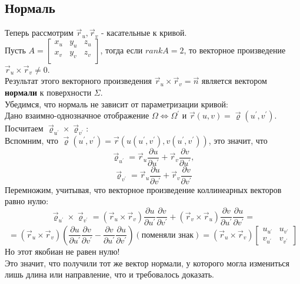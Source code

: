 \documentclass[12pt]{article}
\begin{document}
\subsection{Нормаль}
Теперь рассмотрим $\overrightarrow{r}_u, \overrightarrow{r}_v$ - касательные к кривой.\\
Пусть $A = \begin{bmatrix}
   x_u & y_u & z_u \\
   x_v & y_v & z_v \\
\end{bmatrix}$, тогда если $rank A = 2$, то векторное произведение $\overrightarrow{r}_u \times \overrightarrow{r}_v \neq 0$.\\
Результат этого векторного произведения $\overrightarrow{r}_u \times \overrightarrow{r}_v = \overrightarrow{n}$ является вектором \textbf{нормали} к поверхности $\Sigma$.\\
Убедимся, что нормаль не зависит от параметризации кривой:\\
Дано взаимно-однозначное отображение $\Omega \iff \Omega^{'}$ и $\overrightarrow{r}(u,v) = \overrightarrow{\varrho}(u^{'},v^{'})$.\\
Посчитаем $\overrightarrow{\varrho}_{u^{'}} \times \overrightarrow{\varrho}_{v^{'}}$:\\
Вспомним, что $\overrightarrow{\varrho}(u^{'},v^{'}) = \overrightarrow{r}(u(u^{'},v^{'}),v(u^{'},v^{'}))$, это значит, что\\
$$\overrightarrow{\varrho}_{u^{'}} = \overrightarrow{r}_u \frac{\partial u}{\partial u^{'}} + \overrightarrow{r}_v \frac{\partial v}{\partial u^{'}},$$
$$\overrightarrow{\varrho}_{v^{'}} = \overrightarrow{r}_u \frac{\partial u}{\partial v^{'}} + \overrightarrow{r}_v \frac{\partial v}{\partial v^{'}}$$
Перемножим, учитывая, что векторное произведение коллинеарных векторов равно нулю:\\
$$\overrightarrow{\varrho}_{u^{'}} \times \overrightarrow{\varrho}_{v^{'}} = (\overrightarrow{r}_u \times \overrightarrow{r}_v) \frac{\partial u}{\partial u^{'}} \frac{\partial v}{\partial v^{'}} + (\overrightarrow{r}_v \times \overrightarrow{r}_u) \frac{\partial v}{\partial u^{'}} \frac{\partial u}{\partial v^{'}} = $$
$$ = (\overrightarrow{r}_u \times \overrightarrow{r}_v) (\frac{\partial u}{\partial u^{'}} \frac{\partial v}{\partial v^{'}}-\frac{\partial v}{\partial u^{'}} \frac{\partial u}{\partial v^{'}}) (\text{поменяли знак}) = (\overrightarrow{r}_u \times \overrightarrow{r}_v) \begin{bmatrix} u_{u^{'}} & u_{v^{'}} \\ v_{u^{'}} & v_{v^{'}} \end{bmatrix}$$
Но этот якобиан не равен нулю!\\
Это значит, что получили тот же вектор нормали, у которого могла измениться лишь длина или направление, что и требовалось доказать.\\
\end{document}
